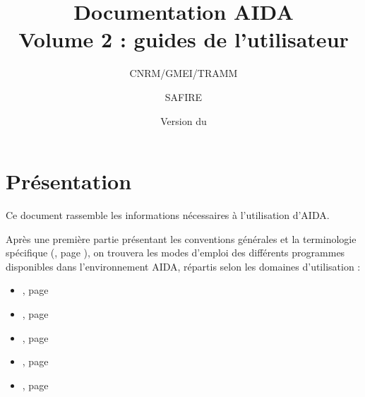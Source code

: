 \documentclass[a4paper,11pt]{article}
\title{Documentation AIDA \\Volume 2 : guides de l'utilisateur}
\author{CNRM/GMEI/TRAMM \and SAFIRE}
\date{Version du \DTMusedate{gitdate}}
\begin{document}
\maketitle
\newpage

\tableofcontents
\newpage

\section*{Présentation}
Ce document rassemble les informations nécessaires
à l'utilisation d'AIDA.

Après une première partie présentant les conventions
générales  et la terminologie spécifique
(, page \pageref{part:conventions}), on trouvera 
les modes d'emploi des différents programmes disponibles dans l'environnement
AIDA, répartis selon les domaines d'utilisation :
\begin{itemize}
  \item {},     page \pageref{part:aito}
  \item {},  page \pageref{part:lecture}
  \item {},   page \pageref{part:traite}
  \item {},   page \pageref{part:graphe}
  \item {}, page \pageref{part:ecriture}
\end{itemize}

\newpage


\newpage


\newpage


\newpage


\newpage


\newpage



\newpage


\newpage

\end{document}
